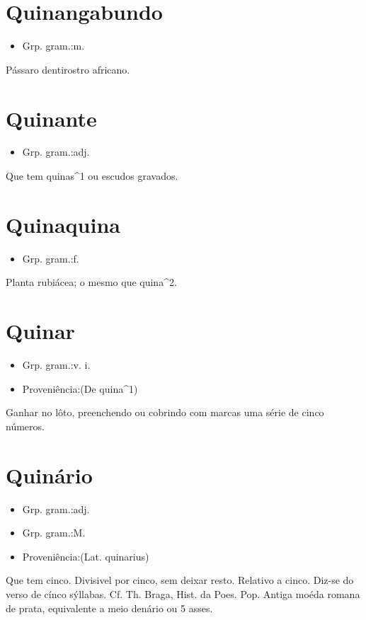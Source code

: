 \section{Quinangabundo}
\begin{itemize}
\item {Grp. gram.:m.}
\end{itemize}
Pássaro dentirostro africano.
\section{Quinante}
\begin{itemize}
\item {Grp. gram.:adj.}
\end{itemize}
Que tem quinas^1 ou escudos gravados.
\section{Quinaquina}
\begin{itemize}
\item {Grp. gram.:f.}
\end{itemize}
Planta rubiácea; o mesmo que \textunderscore quina\textunderscore ^2.
\section{Quinar}
\begin{itemize}
\item {Grp. gram.:v. i.}
\end{itemize}
\begin{itemize}
\item {Proveniência:(De \textunderscore quina\textunderscore ^1)}
\end{itemize}
Ganhar no lôto, preenchendo ou cobrindo com marcas uma série de cinco números.
\section{Quinário}
\begin{itemize}
\item {Grp. gram.:adj.}
\end{itemize}
\begin{itemize}
\item {Grp. gram.:M.}
\end{itemize}
\begin{itemize}
\item {Proveniência:(Lat. \textunderscore quinarius\textunderscore )}
\end{itemize}
Que tem cinco.
Divisivel por cinco, sem deixar resto.
Relativo a cinco.
Diz-se do verso de cínco sýllabas. Cf. Th. Braga, \textunderscore Hist. da Poes. Pop.\textunderscore 
Antiga moéda romana de prata, equivalente a meio denário ou 5 asses.
